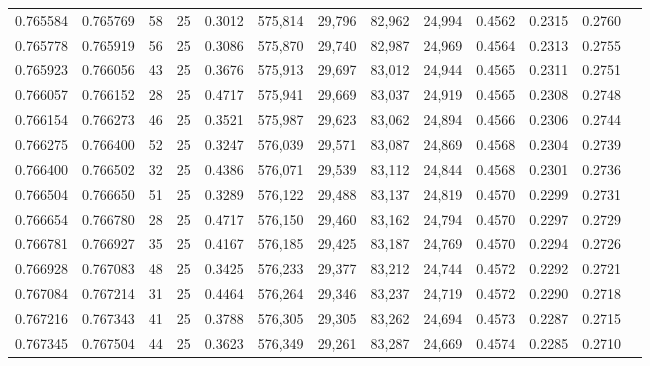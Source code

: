 \begin{tabular}{rrrrrrrrrrrrr}
0.765584 & 0.765769 &    58 &  25 &                                     0.3012 & 575,814 &  29,796 &  82,962 &  24,994 & 0.4562 & 0.2315 & 0.2760 \\
0.765778 & 0.765919 &    56 &  25 &                                     0.3086 & 575,870 &  29,740 &  82,987 &  24,969 & 0.4564 & 0.2313 & 0.2755 \\
0.765923 & 0.766056 &    43 &  25 &                                     0.3676 & 575,913 &  29,697 &  83,012 &  24,944 & 0.4565 & 0.2311 & 0.2751 \\
0.766057 & 0.766152 &    28 &  25 &                                     0.4717 & 575,941 &  29,669 &  83,037 &  24,919 & 0.4565 & 0.2308 & 0.2748 \\
0.766154 & 0.766273 &    46 &  25 &                                     0.3521 & 575,987 &  29,623 &  83,062 &  24,894 & 0.4566 & 0.2306 & 0.2744 \\
0.766275 & 0.766400 &    52 &  25 &                                     0.3247 & 576,039 &  29,571 &  83,087 &  24,869 & 0.4568 & 0.2304 & 0.2739 \\
0.766400 & 0.766502 &    32 &  25 &                                     0.4386 & 576,071 &  29,539 &  83,112 &  24,844 & 0.4568 & 0.2301 & 0.2736 \\
0.766504 & 0.766650 &    51 &  25 &                                     0.3289 & 576,122 &  29,488 &  83,137 &  24,819 & 0.4570 & 0.2299 & 0.2731 \\
0.766654 & 0.766780 &    28 &  25 &                                     0.4717 & 576,150 &  29,460 &  83,162 &  24,794 & 0.4570 & 0.2297 & 0.2729 \\
0.766781 & 0.766927 &    35 &  25 &                                     0.4167 & 576,185 &  29,425 &  83,187 &  24,769 & 0.4570 & 0.2294 & 0.2726 \\
0.766928 & 0.767083 &    48 &  25 &                                     0.3425 & 576,233 &  29,377 &  83,212 &  24,744 & 0.4572 & 0.2292 & 0.2721 \\
0.767084 & 0.767214 &    31 &  25 &                                     0.4464 & 576,264 &  29,346 &  83,237 &  24,719 & 0.4572 & 0.2290 & 0.2718 \\
0.767216 & 0.767343 &    41 &  25 &                                     0.3788 & 576,305 &  29,305 &  83,262 &  24,694 & 0.4573 & 0.2287 & 0.2715 \\
0.767345 & 0.767504 &    44 &  25 &                                     0.3623 & 576,349 &  29,261 &  83,287 &  24,669 & 0.4574 & 0.2285 & 0.2710 \\

\end{tabular}
